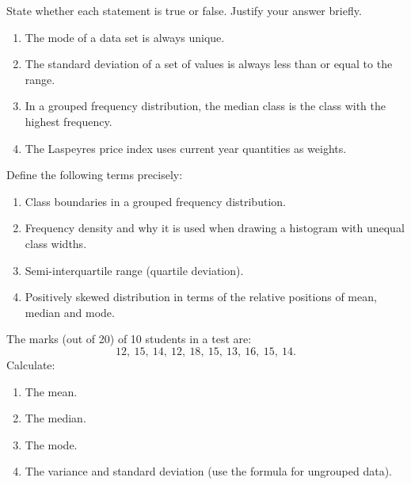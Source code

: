 \documentclass[11pt]{article}
\newcommand{\cle}[1]{{\popxbold\color{popdark}#1}}
\newcounter{popsec}
\newcounter{popsub}
\newcommand{\courssub}[1]{%
  \stepcounter{popsub}%
  \par\vspace{9pt}\noindent{\popxbold\fontsize{11.5}{13}\selectfont\color{popink}{\color{poporange}\thepopsec.\thepopsub}\hspace{6pt}#1}\par\nopagebreak\vspace{4pt}
}
\begin{document}
\begin{exercice}
State whether each statement is true or false. Justify your answer briefly.
\begin{enumerate}
\item The mode of a data set is always unique.
\item The standard deviation of a set of values is always less than or equal to the range.
\item In a grouped frequency distribution, the median class is the class with the highest frequency.
\item The Laspeyres price index uses current year quantities as weights.
\end{enumerate}
\end{exercice}

\begin{exercice}
Define the following terms precisely:
\begin{enumerate}
\item \cle{Class boundaries} in a grouped frequency distribution.
\item \cle{Frequency density} and why it is used when drawing a histogram with unequal class widths.
\item \cle{Semi-interquartile range} (quartile deviation).
\item \cle{Positively skewed distribution} in terms of the relative positions of mean, median and mode.
\end{enumerate}
\end{exercice}

\begin{exercice}
The marks (out of 20) of 10 students in a test are:
\[
12,\ 15,\ 14,\ 12,\ 18,\ 15,\ 13,\ 16,\ 15,\ 14.
\]
Calculate:
\begin{enumerate}
\item The mean.
\item The median.
\item The mode.
\item The variance and standard deviation (use the formula for ungrouped data).
\end{enumerate}
\end{exercice}

\courssub{I practise}
\end{document}
